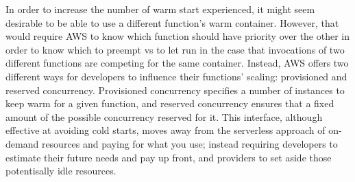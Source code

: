 In order to increase the number of warm start experienced, it might seem
desirable to be able to use a different function's warm container. However, that
would require AWS to know which function should have priority over the other in
order to know which to preempt vs to let run in the case that invocations of two
different functions are competing for the same container. Instead, AWS offers
two different ways for developers to influence their functions' scaling:
provisioned and reserved concurrency\cite{aws-scaling}. Provisioned concurrency
specifies a number of instances to keep warm for a given function, and reserved
concurrency ensures that a fixed amount of the possible concurrency reserved for
it. This interface, although effective at avoiding cold starts, moves away from
the serverless approach of on-demand resources and paying for what you use;
instead requiring developers to estimate their future needs and pay up front,
and providers to set aside those potentisally idle resources.





